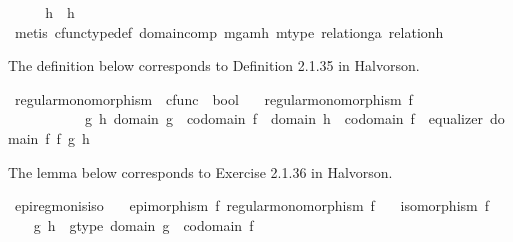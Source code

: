 \begin{isabellebody}
\ \ \isamarkupfalse%
\ \isamarkupfalse%
\ {\isachardoublequoteopen}h{}\ {\isacharequal}{\kern0pt}\ h{}{\isachardoublequoteclose}\isanewline
\ \ \ \ \isamarkupfalse%
\ {\isacharparenleft}{\kern0pt}metis\ cfunc{\isacharunderscore}{\kern0pt}type{\isacharunderscore}{\kern0pt}def\ domain{\isacharunderscore}{\kern0pt}comp\ m{\isacharunderscore}{\kern0pt}ga{\isacharunderscore}{\kern0pt}mh\ m{\isacharunderscore}{\kern0pt}type\ relation{\isacharunderscore}{\kern0pt}ga\ relation{\isacharunderscore}{\kern0pt}h{\isacharparenright}{\kern0pt}\isanewline
{}\isamarkupfalse%
%
\endisatagproof
{\isafoldproof}%
%
\isadelimproof
%
\endisadelimproof
%
\begin{isamarkuptext}%
The definition below corresponds to Definition 2.1.35 in Halvorson.%
\end{isamarkuptext}\isamarkuptrue%
\isamarkupfalse%
\ regular{\isacharunderscore}{\kern0pt}monomorphism\ {\isacharcolon}{\kern0pt}{\isacharcolon}{\kern0pt}\ {\isachardoublequoteopen}cfunc\ {\isasymRightarrow}\ bool{\isachardoublequoteclose}\isanewline
\ \ \ {\isachardoublequoteopen}regular{\isacharunderscore}{\kern0pt}monomorphism\ f\ \ {\isasymlongleftrightarrow}\ \ \isanewline
\ \ \ \ \ \ \ \ \ \ {\isacharparenleft}{\kern0pt}{\isasymexists}\ g\ h{\isachardot}{\kern0pt}\ domain\ g\ {\isacharequal}{\kern0pt}\ codomain\ f\ {\isasymand}\ domain\ h\ {\isacharequal}{\kern0pt}\ codomain\ f\ {\isasymand}\ equalizer\ {\isacharparenleft}{\kern0pt}domain\ f{\isacharparenright}{\kern0pt}\ f\ g\ h{\isacharparenright}{\kern0pt}{\isachardoublequoteclose}%
\begin{isamarkuptext}%
The lemma below corresponds to Exercise 2.1.36 in Halvorson.%
\end{isamarkuptext}\isamarkuptrue%
\isamarkupfalse%
\ epi{\isacharunderscore}{\kern0pt}regmon{\isacharunderscore}{\kern0pt}is{\isacharunderscore}{\kern0pt}iso{\isacharcolon}{\kern0pt}\isanewline
\ \ \ {\isachardoublequoteopen}epimorphism\ f{\isachardoublequoteclose}\ {\isachardoublequoteopen}regular{\isacharunderscore}{\kern0pt}monomorphism\ f{\isachardoublequoteclose}\isanewline
\ \ \ {\isachardoublequoteopen}isomorphism\ f{\isachardoublequoteclose}\isanewline
%
\isadelimproof
%
\endisadelimproof
%
\isatagproof
{}\isamarkupfalse%
\ {\isacharminus}{\kern0pt}\isanewline
\ \ \isamarkupfalse%
\ g\ h\ \ g{\isacharunderscore}{\kern0pt}type{\isacharcolon}{\kern0pt}\ {\isachardoublequoteopen}domain\ g\ {\isacharequal}{\kern0pt}\ codomain\ f{\isachardoublequoteclose}\ \isanewline

\end{isabellebody}
